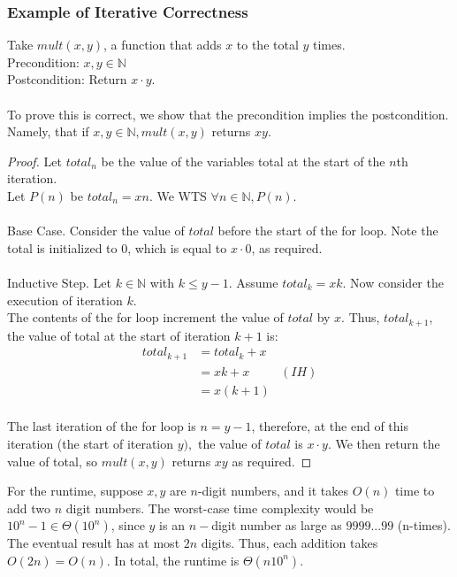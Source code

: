 \documentclass{article}
\begin{document}
\subsubsection{Example of Iterative Correctness}
Take $mult(x,y)$, a function that adds $x$ to the total $y$ times.\\
Precondition:  $x,y \in \mathbb{N}$\\
Postcondition: Return $x \cdot y$.\\
\\
To prove this is correct, we show that the precondition implies the postcondition. Namely, that if $x,y \in \mathbb{N}, mult(x,y)$ returns $xy$.
\begin{proof}
    Let $total_n$ be the value of the variables total at the start of the $n$th iteration.\\
    Let $P(n)$ be $total_n = xn$. We WTS $\forall n \in \mathbb{N}, P(n)$.\\
    \\
    Base Case. Consider the value of $total$ before the start of the for loop. Note the total is initialized to 0, which is equal to $x \cdot 0$, as required.\\
    \\
    Inductive Step. Let $k \in \mathbb{N}$ with $k \leq y-1$. Assume $total_k = xk$. Now consider the execution of iteration $k$.\\
    The contents of the for loop increment the value of $total$ by $x$. Thus, $total_{k+1}$, the value of total at the start of iteration $k+1$ is:
    \begin{align*}
        total_{k+1} & = total_k + x\\
        & = xk + x & (IH)\\
        & = x(k+1)
    \end{align*}\\
    The last iteration of the for loop is $n = y-1$, therefore, at the end of this iteration (the start of iteration $y),$ the value of $total$ is $x \cdot y$. We then return the value of total, so $mult(x,y)$ returns $xy$ as required.
\end{proof}
For the runtime, suppose $x,y$ are $n$-digit numbers, and it takes $O(n)$ time to add two $n$ digit numbers. The worst-case time complexity would be $10^n - 1 \in \Theta(10^n)$, since $y$ is an $n-$digit number as large as $9999...99$ (n-times).\\
The eventual result has at most $2n$ digits. Thus, each addition takes $O(2n) = O(n)$. In total, the runtime is $\Theta(n10^n)$.
\end{document}
